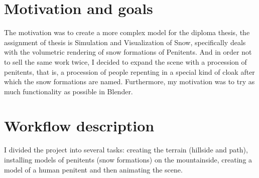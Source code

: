 \documentclass[12pt,a4paper,titlepage,final,tikz,border=4mm]{report}
\begin{document}
\section{Motivation and goals}
The motivation was to create a more complex model for the diploma thesis, the assignment of thesis is Simulation and Visualization of Snow, specifically deals with the volumetric rendering of snow formations of Penitents. And in order not to sell the same work twice, I decided to expand the scene with a procession of penitents, that is, a procession of people repenting in a special kind of cloak after which the snow formations are named. Furthermore, my motivation was to try as much functionality as possible in Blender.

\section{Workflow description}
I divided the project into several tasks: creating the terrain (hillside and path), installing models of penitents (snow formations) on the mountainside, creating a model of a human penitent and then animating the scene.
\end{document}
